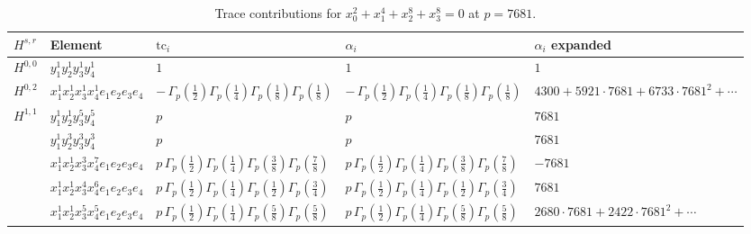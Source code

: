\documentclass[11pt]{article}
\begin{document}
\begin{table}[ht]
\centering
\caption{Trace contributions for $x_0^{2} + x_1^{4} + x_2^{8} + x_3^{8} = 0$ at $p=7681$.}\label{tab:diagonal-11}
\renewcommand{\arraystretch}{1.1}
{\scriptsize
\begin{tabular}{@{}lllll@{}}
\toprule
$H^{s,r}$ & Element & $\mathrm{tc}_i$ & $\alpha_i$ & $\alpha_i$ expanded \\
\midrule
$H^{0,0}$ & $y_{1}^{1} y_{2}^{1} y_{3}^{1} y_{4}^{1}$ & $1$ & $1$ & $1$ \\
\midrule
$H^{0,2}$ & $x_{1}^{1} x_{2}^{1} x_{3}^{1} x_{4}^{1}  e_{1} e_{2} e_{3} e_{4}$ & $- \, \Gamma_p \left( \frac{1}{2} \right) \Gamma_p \left( \frac{1}{4} \right) \Gamma_p \left( \frac{1}{8} \right) \Gamma_p \left( \frac{1}{8} \right)$ & $- \, \Gamma_p \left( \frac{1}{2} \right) \Gamma_p \left( \frac{1}{4} \right) \Gamma_p \left( \frac{1}{8} \right) \Gamma_p \left( \frac{1}{8} \right)$ & $4300{+}5921{\cdot}7681{+}6733{\cdot}7681^{2}{+}\cdots$ \\
\midrule
$H^{1,1}$ & $y_{1}^{1} y_{2}^{1} y_{3}^{5} y_{4}^{5}$ & $p \,$ & $p \,$ & $7681$ \\
 & $y_{1}^{1} y_{2}^{3} y_{3}^{3} y_{4}^{3}$ & $p \,$ & $p \,$ & $7681$ \\
 & $x_{1}^{1} x_{2}^{1} x_{3}^{3} x_{4}^{7}  e_{1} e_{2} e_{3} e_{4}$ & $p \, \Gamma_p \left( \frac{1}{2} \right) \Gamma_p \left( \frac{1}{4} \right) \Gamma_p \left( \frac{3}{8} \right) \Gamma_p \left( \frac{7}{8} \right)$ & $p \, \Gamma_p \left( \frac{1}{2} \right) \Gamma_p \left( \frac{1}{4} \right) \Gamma_p \left( \frac{3}{8} \right) \Gamma_p \left( \frac{7}{8} \right)$ & $-7681$ \\
 & $x_{1}^{1} x_{2}^{1} x_{3}^{4} x_{4}^{6}  e_{1} e_{2} e_{3} e_{4}$ & $p \, \Gamma_p \left( \frac{1}{2} \right) \Gamma_p \left( \frac{1}{4} \right) \Gamma_p \left( \frac{1}{2} \right) \Gamma_p \left( \frac{3}{4} \right)$ & $p \, \Gamma_p \left( \frac{1}{2} \right) \Gamma_p \left( \frac{1}{4} \right) \Gamma_p \left( \frac{1}{2} \right) \Gamma_p \left( \frac{3}{4} \right)$ & $7681$ \\
 & $x_{1}^{1} x_{2}^{1} x_{3}^{5} x_{4}^{5}  e_{1} e_{2} e_{3} e_{4}$ & $p \, \Gamma_p \left( \frac{1}{2} \right) \Gamma_p \left( \frac{1}{4} \right) \Gamma_p \left( \frac{5}{8} \right) \Gamma_p \left( \frac{5}{8} \right)$ & $p \, \Gamma_p \left( \frac{1}{2} \right) \Gamma_p \left( \frac{1}{4} \right) \Gamma_p \left( \frac{5}{8} \right) \Gamma_p \left( \frac{5}{8} \right)$ & $2680{\cdot}7681{+}2422{\cdot}7681^{2}{+}\cdots$ \\

\end{tabular}}
\end{table}
\end{document}
